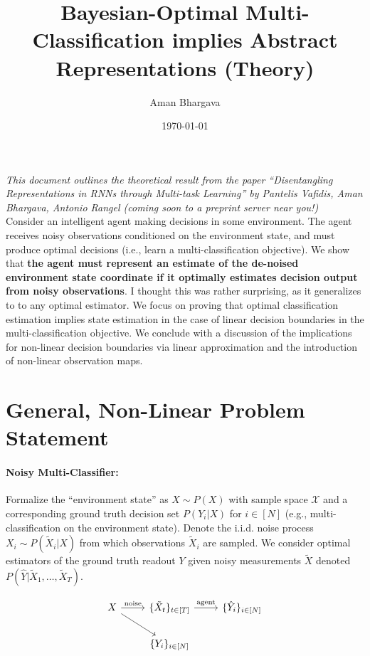 \documentclass[12pt]{article}
\begin{document}
\title{Bayesian-Optimal Multi-Classification implies Abstract Representations (Theory)}

\author{Aman Bhargava}

\date{\today}
\maketitle

\textit{This document outlines the theoretical result from the paper ``Disentangling Representations in RNNs through Multi-task Learning'' by Pantelis Vafidis, Aman Bhargava, Antonio Rangel (coming soon to a preprint server near you!)} \\


Consider an intelligent agent making decisions in some environment.
The agent receives noisy observations conditioned on the environment state, and
must produce optimal decisions (i.e., learn a multi-classification objective).
We show that \textbf{the agent must represent an estimate of the de-noised environment state coordinate if it optimally estimates decision output from noisy observations}. I thought this was rather surprising, as it generalizes to to any optimal estimator. We focus on proving that optimal classification estimation implies state estimation in the case of linear decision boundaries in the multi-classification objective. We conclude with a discussion of the implications for non-linear decision boundaries via linear approximation and the introduction of non-linear observation maps. 


\section{General, Non-Linear Problem Statement}
\label{sec:intro}


\paragraph{Noisy Multi-Classifier: } Formalize the ``environment state'' as $X
\sim P(X)$ with sample space $\mathcal X$ and a corresponding ground truth 
decision set $P(Y_i | X)$ for $i\in [N]$ (e.g., multi-classification on
the environment state). 
Denote the i.i.d. noise process $X_i \sim P(\tilde X_i | X)$ from which
observations $\tilde X_i$ are sampled. 
We consider optimal estimators of the ground truth readout $Y$ given noisy
measurements $\tilde X$ denoted $P(\hat Y | \tilde X_1, \dots, \tilde X_T)$. 


\begin{equation}
	\label{eqn:prob_statement}
	\begin{tikzcd}
		X \arrow[rd] \arrow[r, "\text{noise}"] & \{\tilde X_t\}_{t\in [T]} \arrow[r, "\text{agent}"] & \{\hat Y_i\}_{i\in [N]}\\
		& \{Y_i\}_{i\in [N]}
	\end{tikzcd}
\end{equation}
\end{document}
